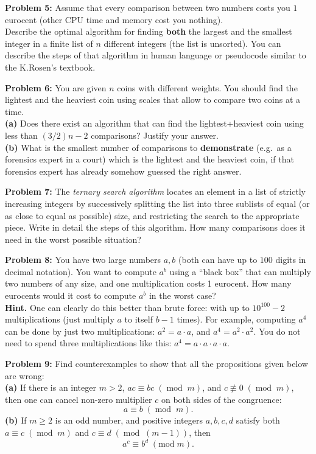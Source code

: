 \documentclass[jou]{apa6}
\begin{document}
\vspace{2ex}
{\bf Problem 5:} 
Assume that every comparison between two numbers 
costs you $1$ eurocent (other CPU time and memory cost you nothing).\\
Describe the optimal 
algorithm for finding {\bf both} the largest and the 
smallest integer in a finite list of $n$ different integers (the list is unsorted).
You can describe the steps of that algorithm in human language or pseudocode
similar to the K.Rosen's textbook.

\vspace{2ex}
{\bf Problem 6:}
You are given $n$ coins with different weights. You should find the lightest and the heaviest coin
using scales that allow to compare two coins at a time.\\
{\bf (a)} Does there exist an algorithm that can find the lightest+heaviest coin
using less than $(3/2)n - 2$ comparisons? Justify your answer.\\
{\bf (b)} What is the smallest number of comparisons to {\bf demonstrate} (e.g.\ 
as a forensics expert in a court) which is the lightest and the heaviest coin, if that forensics 
expert has already somehow guessed the right answer.

\vspace{2ex}
{\bf Problem 7:} 
The {\em ternary search algorithm} locates an element 
in a list of strictly increasing integers by successively splitting the list into 
three sublists of equal (or as close to equal as possible) size, 
and restricting the search to the appropriate piece. 
Write in detail the steps of this algorithm. How many comparisons does it need
in the worst possible situation?

\vspace{2ex}
{\bf Problem 8:} 
You have two large numbers $a,b$ (both can have up to $100$ digits 
in decimal notation). You want to compute $a^b$ using a ``black box'' that can 
multiply two numbers of any size, and one multiplication costs 1 eurocent. 
How many eurocents would it cost to compute $a^b$ in the worst case?\\
{\bf Hint.} One can clearly do this better than brute force: with 
up to $10^{100} - 2$ multiplications 
(just multiply $a$ to itself $b-1$ times). For example, computing $a^4$ can 
be done by just two multiplications: $a^2 = a \cdot a$, and $a^4 = a^2 \cdot a^2$.
You do not need to spend three multiplications like this: $a^4 = a \cdot a \cdot a \cdot a$.


\vspace{2ex}
{\bf Problem 9:}
Find counterexamples to show that all the propositions given below are wrong:\\
{\bf (a)} If there is an integer $m > 2$, 
$ac \equiv bc\;(\operatorname{mod}\;m)$, and $c \not\equiv 0\;(\operatorname{mod}\;m)$, 
then one can cancel non-zero multiplier $c$ on both sides of the congruence:
$$a \equiv b\;(\operatorname{mod}\;m).$$
{\bf (b)} If $m \geq 2$ is an odd number, and positive integers $a,b,c,d$ satisfy 
both $a \equiv c\;(\operatorname{mod}\;m)$ and 
$c \equiv d\;(\operatorname{mod}\;(m-1))$, then
$$a^c \equiv b^d\;(\mbox{mod}\;m).$$
\end{document}
